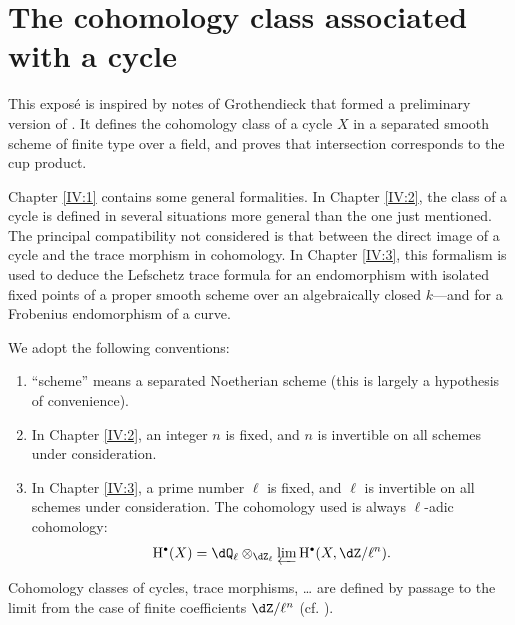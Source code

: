 
\chapter{The cohomology class associated with a cycle}\label{IV}





This exposé is inspired by notes of Grothendieck that formed a preliminary
version of \cite[IV]{sga5}. It defines the cohomology class of a cycle $X$ in
a separated smooth scheme of finite type over a field, and proves that
intersection corresponds to the cup product.

Chapter \ref{IV:1} contains some general formalities. In Chapter \ref{IV:2},
the class of a cycle is defined in several situations more general than the
one just mentioned. The principal compatibility not considered is that
between the direct image of a cycle and the trace morphism in cohomology. In
Chapter \ref{IV:3}, this formalism is used to deduce the Lefschetz trace
formula for an endomorphism with isolated fixed points of a proper smooth
scheme over an algebraically closed $k$---and for a Frobenius endomorphism of
a curve.

We adopt the following conventions:
\begin{enumerate}[\indent 1)]
  \item ``scheme'' means a separated Noetherian scheme (this is largely a
    hypothesis of convenience).
  \item In Chapter \ref{IV:2}, an integer $n$ is fixed, and $n$ is invertible
    on all schemes under consideration.
  \item In Chapter \ref{IV:3}, a prime number $\ell$ is fixed, and $\ell$ is
    invertible on all schemes under consideration. The cohomology used is
    always $\ell$-adic cohomology:
    \[
      \h^\bullet(X) = \dQ_\ell\otimes_{\dZ_\ell} \varprojlim \h^\bullet(X,\dZ/\ell^n) \text{.}
    \]
\end{enumerate}
Cohomology classes of cycles, trace morphisms, \ldots{} are defined by passage
to the limit from the case of finite coefficients $\dZ/\ell^n$ (cf.
\cite[VI]{sga5}).




















